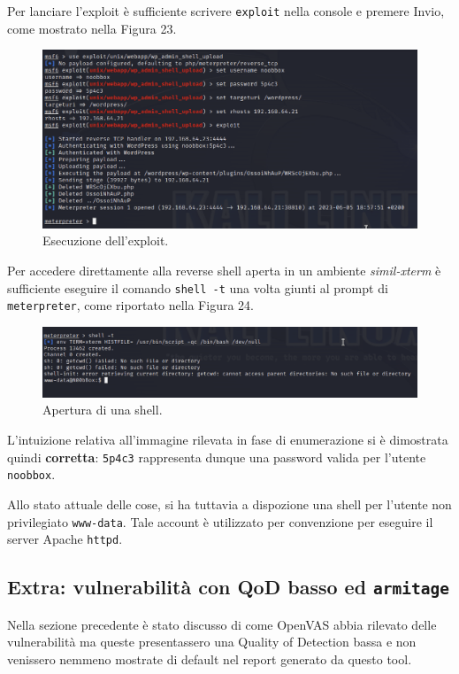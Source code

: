 \documentclass[a4paper, 12pt, oneside]{article}
\begin{document}
Per lanciare l'exploit è sufficiente scrivere \texttt{exploit} nella console e premere Invio, come mostrato nella Figura 23.

\begin{figure}[h!]
    \centering
    \includegraphics[width=\textwidth]{img/metaspolit_exploit.png}
    \caption{Esecuzione dell'exploit.}
\end{figure}

\newpage

Per accedere direttamente alla reverse shell aperta in un ambiente \textit{simil-xterm} è sufficiente eseguire il comando \texttt{shell -t} una volta giunti al prompt di \texttt{meterpreter}, come riportato nella Figura 24.

\begin{figure}[h!]
    \centering
    \includegraphics[width=\textwidth]{img/meterpreter-shell.png}
    \caption{Apertura di una shell.}
\end{figure}

L'intuizione relativa all'immagine rilevata in fase di enumerazione si è dimostrata quindi \textbf{corretta}: \texttt{5p4c3} rappresenta dunque una password valida per l'utente \texttt{noobbox}.

Allo stato attuale delle cose, si ha tuttavia a dispozione una shell per l'utente non privilegiato \texttt{www-data}. Tale account è utilizzato per convenzione per eseguire il server Apache \texttt{httpd}\cite{www-data}.

\subsection{Extra: vulnerabilità con QoD basso ed \texttt{armitage}}
Nella sezione precedente è stato discusso di come OpenVAS abbia rilevato delle vulnerabilità ma queste presentassero una Quality of Detection bassa e non venissero nemmeno mostrate di default nel report generato da questo tool. 
\end{document}
